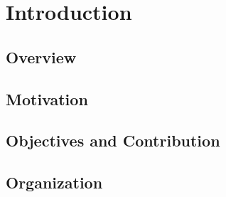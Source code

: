 \chapter{\label{chapter:1_Introduction}Introduction}
\section{\label{section:Overview}Overview}
\section{\label{section:Motivation}Motivation}
\section{\label{section:Objectives}Objectives and Contribution}
\section{\label{section:Organization}Organization}